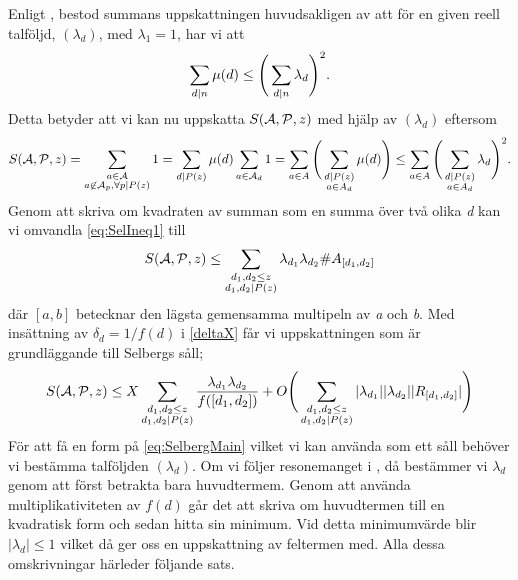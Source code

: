 Enligt \cite{cojocarumurty}, bestod summans uppskattningen huvudsakligen av att för en given reell talföljd, \((\lambda_d)\), med \(\lambda_1 = 1\), har vi att 
\begin{equation}
    \sum_{d\divides n}\mu(d) \leq \Bigg(\sum_{d\divides n}\lambda_d\Bigg)^2.\nonumber
\end{equation}
Detta betyder att vi kan nu uppskatta \(\S{A}{P}{z}\) med hjälp av \((\lambda_d)\) eftersom
\begin{equation}
\S{A}{P}{z} = \sum_{\substack{a\in \mathcal{A}\\a\not\in\mathcal{A}_p,\forall p\divides P(z)}} 1 = \sum_{d\divides P(z)} \mu(d) \sum_{a\in\mathcal{A}_d}1 = \sum_{a\in A} \Bigg(\sum_{\substack{d\divides P(z)\\a\in A_d}}\mu(d)\Bigg)\leq \sum_{a\in A}\Bigg(\sum_{\substack{d\divides P(z)\\a\in A_d}}\lambda_d\Bigg)^2.\label{eq:SelIneq1}
\end{equation}
Genom att skriva om kvadraten av summan som en summa över två olika \textit{d} kan vi omvandla \eqref{eq:SelIneq1} till
\begin{equation}
    \S{A}{P}{z} \leq \sum_{\substack{d_1,d_2\leq z\\d_1,d_2\divides P(z)}}\lambda_{d_1}\lambda_{d_2}\#A_{[d_1, d_2]}\nonumber
\end{equation}
där \([a, b]\) betecknar den lägsta gemensamma multipeln av \textit{a} och \textit{b}. Med insättning av \(\delta_d = 1/f(d)\) i \eqref{deltaX} får vi uppskattningen som är grundläggande  till Selbergs såll;
\begin{equation}
    \S{A}{P}{z} \leq X\sum_{\substack{d_1,d_2\leq z\\d_1,d_2\divides P(z)}}\frac{\lambda_{d_1}\lambda_{d_2}}{f([d_1,d_2])} + O\Bigg(\sum_{\substack{d_1,d_2\leq z\\d_1,d_2\divides P(z)}}|\lambda_{d_1}||\lambda_{d_2}||R_{[d_1, d_2]}|\Bigg)\label{eq:SelbergMain}
\end{equation}
För att få en form på \eqref{eq:SelbergMain} vilket vi kan använda som ett såll behöver vi bestämma talföljden \((\lambda_d)\). Om vi följer resonemanget i \cite{cojocarumurty}, då bestämmer vi \(\lambda_d\) genom att först betrakta bara huvudtermem. Genom att använda multiplikativiteten av \(f(d)\) går det att skriva om huvudtermen till en kvadratisk form och sedan hitta sin minimum. Vid detta minimumvärde blir \(|\lambda_d|\leq 1\) vilket då ger oss en uppskattning av feltermen med. Alla dessa omskrivningar härleder följande sats.

